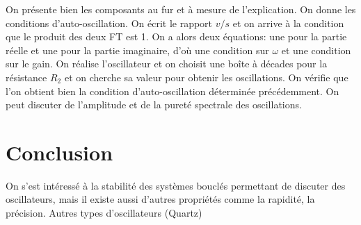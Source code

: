 \documentclass[french, a4paper, 10pt, twocolumn, landscape]{article}
\begin{document}
On présente bien les composants au fur et à mesure de l'explication. On donne les conditions d'auto-oscillation. On écrit le rapport $v/s$ et on arrive à la condition que le produit des deux FT est 1. On a alors deux équations: une pour la partie réelle et une pour la partie imaginaire, d'où une condition sur $\omega$ et une condition sur le gain. On réalise l'oscillateur et on choisit une boîte à décades pour la résistance $R_2$ et on cherche sa valeur pour obtenir les oscillations. On vérifie que l'on obtient bien la condition d'auto-oscillation déterminée précédemment. On peut discuter de l'amplitude et de la pureté spectrale des oscillations.

\section*{Conclusion}

On s'est intéressé à la stabilité des systèmes bouclés permettant de discuter des oscillateurs, mais il existe aussi d'autres propriétés comme la rapidité, la précision. Autres types d'oscillateurs (Quartz)
\end{document}
